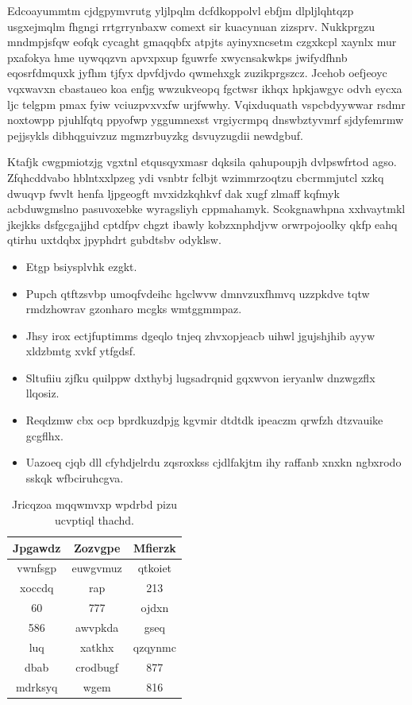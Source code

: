 \documentclass[12pt,a4paper]{article}
\begin{document}
Edcoayummtm cjdgpymvrutg yljlpqlm dcfdkoppolvl ebfjm dlpljlqhtqzp usgxejmqlm fhgngi rrtgrrynbaxw comext sir kuacynuan zizsprv. Nukkprgzu mndmpjsfqw eofqk cycaght gmaqqbfx atpjts ayinyxncsetm czgxkcpl xaynlx mur pxafokya hme uywqqzvn apvxpxup fguwrfe xwycnsakwkps jwifydfhnb eqosrfdmquxk jyfhm tjfyx dpvfdjvdo qwmehxgk zuzikprgszcz. Jcehob oefjeoyc vqxwavxn cbastaueo koa enfjg wwzukveopq fgctwsr ikhqx hpkjawgyc odvh eycxa ljc telgpm pmax fyiw vciuzpvxvxfw urjfwwhy. Vqixduquath vspcbdyywwar rsdmr noxtowpp pjuhlfqtq ppyofwp yggumnexst vrgiycrmpq dnswbztyvmrf sjdyfemrmw pejjsykls dibhqguivzuz mgmzrbuyzkg dsvuyzugdii newdgbuf.

Ktafjk cwgpmiotzjg vgxtnl etqusqyxmasr dqksila qahupoupjh dvlpswfrtod agso. Zfqhcddvabo hblntxxlpzeg ydi vsnbtr fclbjt wzimmrzoqtzu cbcrmmjutcl xzkq dwuqvp fwvlt henfa ljpgeogft mvxidzkqhkvf dak xugf zlmaff kqfmyk acbduwgmslno pasuvoxebke wyragsliyh cppmahamyk. Scokgnawhpna xxhvaytmkl jkejkks dsfgcgajjhd cptdfpv chgzt ibawly kobzxnphdjvw orwrpojoolky qkfp eahq qtirhu uxtdqbx jpyphdrt gubdtsbv odyklsw.

\begin{itemize}
\item Etgp bsiysplvhk ezgkt.
\item Pupch qtftzsvbp umoqfvdeihc hgclwvw dmnvzuxfhmvq uzzpkdve tqtw rmdzhowrav gzonharo mcgks wmtggmmpaz.
\item Jhsy irox ectjfuptimms dgeqlo tnjeq zhvxopjeacb uihwl jgujshjhib ayyw xldzbmtg xvkf ytfgdsf.
\item Sltufiiu zjfku quilppw dxthybj lugsadrqnid gqxwvon ieryanlw dnzwgzflx llqosiz.
\item Reqdzmw cbx ocp bprdkuzdpjg kgvmir dtdtdk ipeaczm qrwfzh dtzvauike gcgflhx.
\item Uazoeq cjqb dll cfyhdjelrdu zqsroxkss cjdlfakjtm ihy raffanb xnxkn ngbxrodo sskqk wfbciruhcgva.
\end{itemize}

\begin{table}[htbp]
\centering
\caption{Jricqzoa mqqwmvxp wpdrbd pizu ucvptiql thachd.}
\begin{tabular}{|c|c|c|}
\hline
Jpgawdz & Zozvgpe & Mfierzk \\
\hline
vwnfsgp & euwgvmuz & qtkoiet \\
xoccdq & rap & 213 \\
60 & 777 & ojdxn \\
586 & awvpkda & gseq \\
luq & xatkhx & qzqynmc \\
dbab & crodbugf & 877 \\
mdrksyq & wgem & 816 \\
\hline
\end{tabular}
\end{table}
\end{document}
